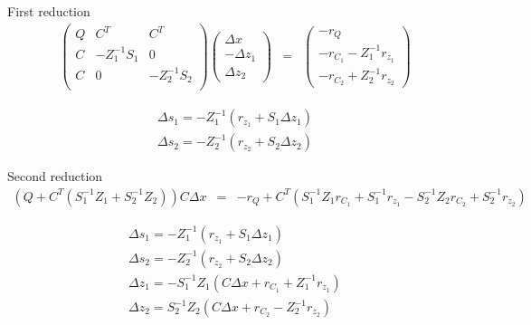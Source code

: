 \documentclass[a4paper]{paper}
\begin{document}
First reduction
\begin{eqnarray*}
\left(\begin{array}{ccc}
Q & C^T & C^T \\
C & -Z_1^{-1} S_1  & 0   \\
C & 0   & -Z_2^{-1}S_2 \\
\end{array}\right)
\left(\begin{array}{c}
\Delta x\\
-\Delta z_1\\
\Delta z_2
\end{array}\right)
&=&
\left(\begin{array}{c}
-r_Q\\
-r_{C_1} - Z_1^{-1} r_{z_1}\\
-r_{C_2} + Z_2^{-1} r_{z_2}
\end{array}\right)
\end{eqnarray*}

\[
\begin{array}{c}
\Delta s_1 = -Z_1^{-1} (r_{z_1} + S_1 \Delta z_1)\\
\Delta s_2 = -Z_2^{-1} (r_{z_2} + S_2 \Delta z_2)
\end{array}
\]

Second reduction
\begin{eqnarray*}
(Q + C^T (S_1^{-1} Z_1 + S_2^{-1} Z_2))C \Delta x
&=&
-r_Q + C^T (S_1^{-1}  Z_1 r_{C_1} + S_1^{-1} r_{z_1} - S_2^{-1} Z_2 r_{C_2} + S_2^{-1} r_{z_2})
\end{eqnarray*}

\[
\begin{array}{c}
\Delta s_1 = -Z_1^{-1} (r_{z_1} + S_1 \Delta z_1)\\
\Delta s_2 = -Z_2^{-1} (r_{z_2} + S_2 \Delta z_2)\\
\Delta z_1 = -S_1^{-1} Z_1 ( C \Delta x + r_{C_1} + Z_1^{-1} r_{z_1} )\\
\Delta z_2 = S_2^{-1} Z_2 ( C \Delta x + r_{C_2} - Z_2^{-1} r_{z_2})
\end{array}
\]
\end{document}

